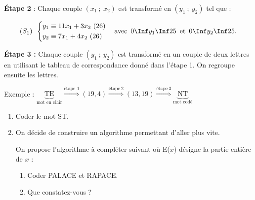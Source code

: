 \begin{TP}
\begin{minipage}{0.8\textwidth}
\textbf{Étape 2} : Chaque couple $\left(x_{1}~;~x_{2}\right)$ est transformé en $\left(y_{1}~;~y_{2}\right)$ tel que :\vspace{-5pt}

$$\left(S_{1}\right)\enskip
\left\{\begin{aligned}
&y_{1} \equiv 11x_{1} + 3x_{2}~(26)\\ 
&y_{2} \equiv 	7x_{1} + 4x_{2}~(26)
\end{aligned}\right.
\quad  	\text{avec}\enskip 0\Inf y_{1}\Inf25\enskip\text{et}\enskip0 \Inf y_{2} \Inf25.\vspace{-5pt}$$

\textbf{Étape 3 :} Chaque couple $\left(y_{1}~;~y_{2}\right)$ est transformé en un couple de deux lettres en utilisant le tableau de correspondance donné dans l'étape 1. On regroupe ensuite les lettres.\medskip

Exemple : $\underbrace{\text{TE}}_{{\text{mot en
      clair}}}\stackrel{\text{étape } 1}{\Longrightarrow}   
(19,4) \stackrel{\text{étape}\ 2}{\Longrightarrow} (13,19)
\stackrel{\text{étape}\ 3}{\Longrightarrow}
\underbrace{\text{NT}}_{{\text{mot codé}}}$
\end{minipage}

\begin{enumerate}
\item Coder le mot ST. 
\item On décide de construire un algorithme permettant d'aller plus vite. 

On propose l'algorithme  à compléter suivant où E($x$) désigne la partie entière de $x$ :

\begin{center}
\begin{algorithme}
\BlocVariables
{}
\BlocEntrees
{}
\BlocTraitements
{}\vspace{3pt}%
\vspace{3pt}%
\vspace{3pt}
\BlocAffichage
{}
\end{algorithme}
\end{center}\medskip

\begin{enumerate}
\item Coder PALACE et RAPACE.
\item Que constatez-vous ?
\end{enumerate}


\end{enumerate}
\end{TP}
